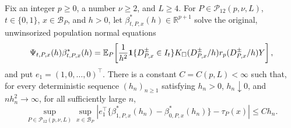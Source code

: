 Fix an integer \(p\geq0\), a number \(\nu\geq2\), and \(L\geq4\).  For \(P\in\mathcal P_{12}(p,\nu,L)\), \(t\in\{0,1\}\), \(x\in\mathcal B_P\), and \(h>0\), let \(\beta^*_{t,P,x}(h)\in\mathbb R^{p+1}\) solve the original, unwinsorized population normal equations
\[
 \Psi_{t,P,x}(h)\beta^*_{t,P,x}(h)
 =\mathbb E_P\!\left[
 {1\over h^2}\mathbf1\{D^{\pm}_{P,x}\in I_t\}K_\square(D^{\pm}_{P,x}/h)
 r_p(D^{\pm}_{P,x}/h)Y
 \right],
\]
and put \(e_1=(1,0,\ldots,0)^\top\).  There is a constant \(C=C(p,L)<\infty\) such that, for every deterministic sequence \((h_n)_{n\geq1}\) satisfying \(h_n>0\), \(h_n\downarrow0\), and \(nh_n^2\to\infty\), for all sufficiently large \(n\),
\[
 \sup_{P\in\mathcal P_{12}(p,\nu,L)}
 \sup_{x\in\mathcal B_P}
 \left|
 e_1^\top\{\beta^*_{1,P,x}(h_n)-\beta^*_{0,P,x}(h_n)\}-\tau_P(x)
 \right|
 \leq Ch_n.
\]
